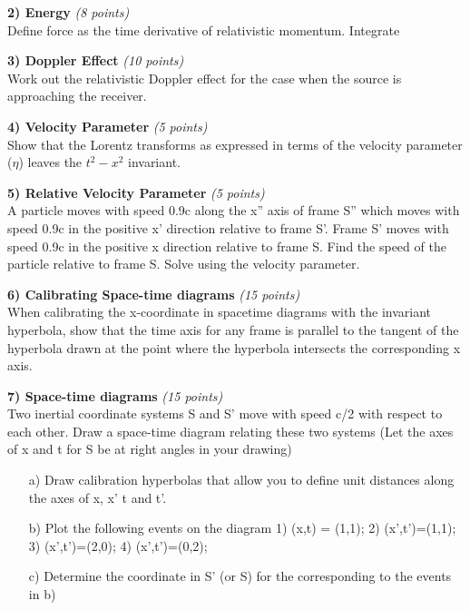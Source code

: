 {\large
\textbf{2) Energy } \hfill \textit{(8 points)}\\
Define force as the time derivative of relativistic momentum.
Integrate 

\vspace*{0.25in}


\textbf{3) Doppler Effect } \hfill \textit{(10 points)}\\
Work out the relativistic Doppler effect for the case when the source is approaching the receiver.

\vspace*{0.25in}

\textbf{4) Velocity Parameter  } \hfill \textit{(5 points)}\\
Show that the Lorentz transforms as expressed in terms of the velocity parameter ($\eta$) leaves the $t^2-x^2$ invariant.

\vspace*{0.25in}


\textbf{5) Relative Velocity Parameter  } \hfill \textit{(5 points)}\\
A particle moves with speed 0.9c along the x'' axis of frame S'' which moves with speed 0.9c in the positive x' direction relative to frame S'.
Frame S' moves with speed 0.9c in the positive x direction relative to frame S. Find the speed of the particle relative to frame S.
Solve using the velocity parameter.

\vspace*{0.25in}

\textbf{6) Calibrating Space-time diagrams  } \hfill \textit{(15 points)}\\
When calibrating the x-coordinate in spacetime diagrams with the invariant hyperbola, show that the time axis for any frame is parallel to the tangent of the hyperbola drawn at the point where the hyperbola intersects the corresponding x axis.

\vspace*{0.25in}

\clearpage

\textbf{7) Space-time diagrams  } \hfill \textit{(15 points)}\\
Two inertial coordinate systems S and S' move with speed c/2 with respect to each other.
Draw a  space-time diagram relating these two systems (Let the axes of x and t for S be at right angles in your drawing)

\begin{itemize}
\item[a)] Draw calibration hyperbolas that allow you to define unit distances along the axes of x, x' t and t'.
\item[b)] Plot the following events on the diagram 1) (x,t) = (1,1); 2) (x',t')=(1,1); 3) (x',t')=(2,0); 4) (x',t')=(0,2);
\item[c)] Determine the coordinate in S' (or S) for the corresponding to the events in b)
\end{itemize}

}
